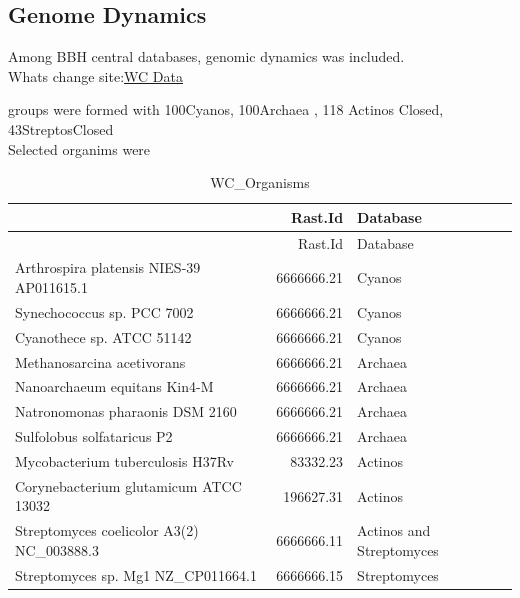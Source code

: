 \documentclass[12pt,twoside]{reedthesis}
\begin{document}
  \subsection{Genome Dynamics}\label{genome-dynamics}
  
  Among BBH central databases, genomic dynamics was included.\\
  Whats change
  site:\href{http://pubseed.theseed.org/wc.cgi?request=show_otus\&base=/homes/nselem/Data/CS}{WC
  Data}
  
  groups were formed with 100Cyanos, 100Archaea , 118 Actinos Closed,
  43StreptosClosed\\
  Selected organims were
  
  \begin{Shaded}
  \begin{Highlighting}[]
  \StringTok{ }\NormalTok{(}\NormalTok{, } \NormalTok{,}\NormalTok{)}
   \CharTok{\textbackslash{}\textbackslash{}}\NormalTok{,} \NormalTok{)}
  \end{Highlighting}
  \end{Shaded}
  
  \begin{longtable}[c]{@{}lrl@{}}
  \caption{WC\_Organisms \label{tab:WC_Organisms}}\tabularnewline
  \toprule
  & Rast.Id & Database\tabularnewline
  \midrule
  \endfirsthead
  \toprule
  & Rast.Id & Database\tabularnewline
  \midrule
  \endhead
  Arthrospira platensis NIES-39 AP011615.1 & 6666666.21 &
  Cyanos\tabularnewline
  Synechococcus sp. PCC 7002 & 6666666.21 & Cyanos\tabularnewline
  Cyanothece sp. ATCC 51142 & 6666666.21 & Cyanos\tabularnewline
  Methanosarcina acetivorans & 6666666.21 & Archaea\tabularnewline
  Nanoarchaeum equitans Kin4-M & 6666666.21 & Archaea\tabularnewline
  Natronomonas pharaonis DSM 2160 & 6666666.21 & Archaea\tabularnewline
  Sulfolobus solfataricus P2 & 6666666.21 & Archaea\tabularnewline
  Mycobacterium tuberculosis H37Rv & 83332.23 & Actinos\tabularnewline
  Corynebacterium glutamicum ATCC 13032 & 196627.31 &
  Actinos\tabularnewline
  Streptomyces coelicolor A3(2) NC\_003888.3 & 6666666.11 & Actinos and
  Streptomyces\tabularnewline
  Streptomyces sp. Mg1 NZ\_CP011664.1 & 6666666.15 &
  Streptomyces\tabularnewline
  \bottomrule
  \end{longtable}
  
\end{document}
